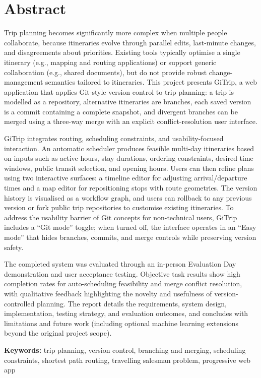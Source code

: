 \chapter*{Abstract}

Trip planning becomes significantly more complex when multiple people collaborate,
because itineraries evolve through parallel edits, last-minute changes, and
disagreements about priorities. Existing tools typically optimise a single
itinerary (e.g., mapping and routing applications) or support generic
collaboration (e.g., shared documents), but do not provide robust
change-management semantics tailored to itineraries. This project presents
GiTrip, a web application that applies Git-style
version control to trip planning: a trip is modelled as a repository,
alternative itineraries are branches, each saved version is a commit containing
a complete snapshot, and divergent branches can be merged using a three-way
merge with an explicit conflict-resolution user interface.

GiTrip integrates routing, scheduling constraints, and usability-focused
interaction. An automatic scheduler produces feasible multi-day itineraries
based on inputs such as active hours, stay durations, ordering constraints,
desired time windows, public transit selection, and opening hours. Users can
then refine plans using two interactive surfaces: a timeline editor for
adjusting arrival/departure times and a map editor for repositioning stops with
route geometries. The version history is visualised as a workflow graph,
and users can rollback to any previous version or fork public trip repositories
to customise existing itineraries. To address the usability barrier of Git
concepts for non-technical users, GiTrip includes a ``Git mode'' toggle; when
turned off, the interface operates in an ``Easy mode'' that hides branches, commits, and merge controls while preserving version safety.

The completed system was evaluated through an in-person Evaluation Day
demonstration and user acceptance testing. Objective task results show high
completion rates for auto-scheduling feasibility and merge conflict resolution,
with qualitative feedback highlighting the novelty and usefulness of
version-controlled planning. The report details the requirements, system design,
implementation, testing strategy, and evaluation outcomes, and concludes with
limitations and future work (including optional machine learning extensions
beyond the original project scope).

\vspace{0.6em}
\textbf{Keywords:} trip planning, version control, branching and merging, scheduling constraints, shortest path routing, travelling salesman problem, progressive web app